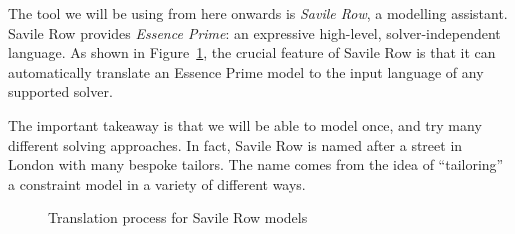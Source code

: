 The tool we will be using from here onwards is \emph{Savile Row}, a modelling
assistant. Savile Row provides \emph{Essence Prime}: an expressive high-level,
solver-independent language. As shown in Figure~\ref{fig-sr}, the crucial
feature of Savile Row is that it can automatically translate an Essence Prime
model to the input language of any supported solver. 

The important takeaway is that we will be able to model once, and try many
different solving approaches.  In fact, Savile Row is named after a street in
London with many bespoke tailors. The name comes from the idea of ``tailoring''
a constraint model in a variety of different ways.

\begin{figure}[h]
    \label{fig-sr}
    \centering
    \caption{Translation process for Savile Row models}
\end{figure}

